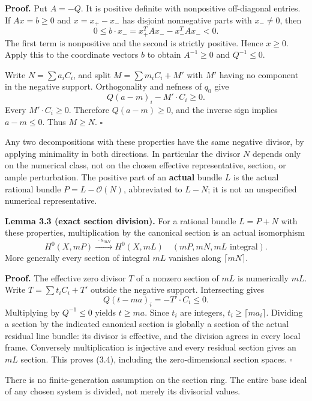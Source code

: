 \documentclass[
  10pt,
]{article}
\begin{document}
\textbf{Proof.} Put \(A=-Q\). It is positive definite with nonpositive
off-diagonal entries. If \(Ax=b\geq0\) and \(x=x_+-x_-\) has disjoint
nonnegative parts with \(x_-\ne0\), then \[
 0\leq b\cdot x_-=x_+^TAx_- -x_-^TAx_-<0.
\] The first term is nonpositive and the second is strictly positive.
Hence \(x\geq0\). Apply this to the coordinate vectors \(b\) to obtain
\(A^{-1}\geq0\) and \(Q^{-1}\leq0\).

Write \(N=\sum a_iC_i\), and split \(M=\sum m_iC_i+M'\) with \(M'\)
having no component in the negative support. Orthogonality and nefness
of \(q_0\) give \[
 Q(a-m)_i-M'\cdot C_i\geq0.
\] Every \(M'\cdot C_i\geq0\). Therefore \(Q(a-m)\geq0\), and the
inverse sign implies \(a-m\leq0\). Thus \(M\geq N\). \(\square\)

Any two decompositions with these properties have the same negative
divisor, by applying minimality in both directions. In particular the
divisor \(N\) depends only on the numerical class, not on the chosen
effective representative, section, or ample perturbation. The positive
part of an \textbf{actual} bundle \(L\) is the actual rational bundle
\(P=L-\mathcal O(N)\), abbreviated to \(L-N\); it is not an unspecified
numerical representative.

\textbf{Lemma 3.3 (exact section division).} For a rational bundle
\(L=P+N\) with these properties, multiplication by the canonical section
is an actual isomorphism \[
 H^0(X,mP)\xrightarrow{\;\cdot s_{mN}\;}H^0(X,mL)
                   \quad(mP,mN,mL\text{ integral}).              \tag{3.4}
\] More generally every section of integral \(mL\) vanishes along
\(\lceil mN\rceil\).

\textbf{Proof.} The effective zero divisor \(T\) of a nonzero section of
\(mL\) is numerically \(mL\). Write \(T=\sum t_iC_i+T'\) outside the
negative support. Intersecting gives \[
 Q(t-ma)_i=-T'\cdot C_i\leq0.
\] Multiplying by \(Q^{-1}\leq0\) yields \(t\geq ma\). Since \(t_i\) are
integers, \(t_i\geq\lceil ma_i\rceil\). Dividing a section by the
indicated canonical section is globally a section of the actual residual
line bundle: its divisor is effective, and the division agrees in every
local frame. Conversely multiplication is injective and every residual
section gives an \(mL\) section. This proves (3.4), including the
zero-dimensional section spaces. \(\square\)

There is no finite-generation assumption on the section ring. The entire
base ideal of any chosen system is divided, not merely its divisorial
values.
\end{document}
